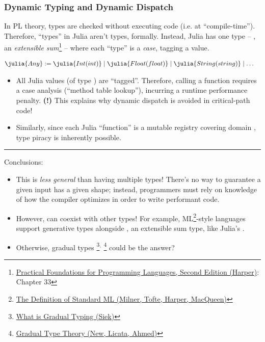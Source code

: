 \documentclass[8pt]{beamer}
\newcommand{\yikes}{\textbf{\color{red} (!) }}
\begin{document}
\begin{frame}
  \frametitle{Dynamic Typing and Dynamic Dispatch}

  In PL theory, types are checked without executing code (i.e. at ``compile-time''). Therefore, ``types'' in Julia aren't types, formally. Instead, Julia has one type -- , an \emph{extensible sum}\footnote{\href{http://www.cs.cmu.edu/~rwh/pfpl/}{Practical Foundations for Programming Languages, Second Edition (Harper)}: Chapter 33} -- where each ``type'' is a \emph{case}, tagging a value.

  \begin{align*}
    &\julia{Any} := \julia{Int(int)} \mid \julia{Float(float)} \mid \julia{String(string)} \mid \dots
  \end{align*}

  \begin{itemize}
    \item All Julia values (of type ) are ``tagged''. Therefore, calling a function requires a case analysis (``method table lookup''), incurring a runtime performance penalty. \yikes This explains why dynamic dispatch is avoided in critical-path code!
    \item Similarly, since each Julia ``function'' is a mutable registry covering domain , type piracy is inherently possible.
  \end{itemize}

  \noindent\rule{\linewidth}{0.4pt}

  Conclusions:
  \begin{itemize}
    \item This is \emph{less general} than having multiple types! There's no way to guarantee a given input has a given shape; instead, programmers must rely on knowledge of how the compiler optimizes in order to write performant code.
    \item However,  can coexist with other types! For example, ML\footnote{\href{https://smlfamily.github.io/sml97-defn.pdf}{The Definition of Standard ML (Milner, Tofte, Harper, MacQueen)}}-style languages support generative types alongside , an extensible sum type, like Julia's .
    \item Otherwise, gradual types%
    \footnote{\href{https://wphomes.soic.indiana.edu/jsiek/what-is-gradual-typing/}{What is Gradual Typing (Siek)}}$^,$%
    \footnote{\href{http://www.ccs.neu.edu/home/amal/papers/gtt.pdf}{Gradual Type Theory (New, Licata, Ahmed)}}
    could be the answer?
  \end{itemize}
\end{frame}
\end{document}
